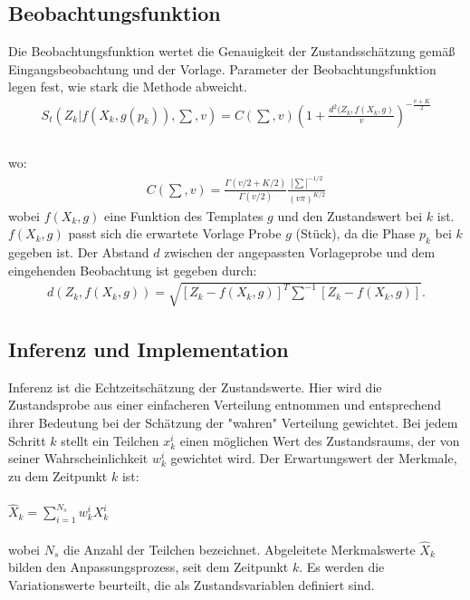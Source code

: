 \documentclass{llncs}
\begin{document}
\subsection{Beobachtungsfunktion} 
Die Beobachtungsfunktion wertet die Genauigkeit der Zustandsschätzung gemäß Eingangsbeobachtung und der Vorlage. Parameter der Beobachtungsfunktion legen fest, wie stark die Methode abweicht.
\begin{equation}
\left.\begin{array}{l}
S_t(Z_k|f(X_k, g(p_k)),\sum,v) = C(\sum, v)(1+ \frac{d^2(Z_k, f(X_k,g)}{v}  )^{-\frac{v+K}{2}}		
\\
\end{array}\right.		
\end{equation}	
\\
wo:
\begin{equation}
\left.\begin{array}{l}
C(\sum, v) =  \frac{\Gamma(v/2+K/2)  }{\Gamma(v/2) }\frac{|\sum|^{-1/2}}{(v \pi)^{K/2}}
\end{array}\right.
\end{equation}
wobei $f (X_k, g)$ eine Funktion des Templates $g$ und den Zustandswert bei $k$ ist. $ f (X_k, g)$ passt sich die erwartete Vorlage Probe $g$ (Stück), da die Phase $p_k$ bei $k$ gegeben ist. Der Abstand $d$ zwischen der angepassten Vorlageprobe und dem eingehenden Beobachtung ist gegeben durch:
\begin{equation}
\left.\begin{array}{l}
d(Z_k, f(X_k, g)) = \sqrt{[Z_k - f(X_k, g)]^T \sum^{-1} [Z_k - f(X_k,g)]}.			
\end{array}\right.		
\end{equation}	

\subsection{ Inferenz und Implementation}
Inferenz ist die Echtzeitschätzung der Zustandswerte. Hier wird die  Zustandsprobe aus einer einfacheren Verteilung entnommen und entsprechend ihrer Bedeutung bei der Schätzung der "wahren" Verteilung gewichtet. Bei jedem Schritt $k$ stellt ein Teilchen $x^i_k$ einen möglichen Wert des Zustandsraums, der von seiner Wahrscheinlichkeit $w^i _k$ gewichtet wird. Der Erwartungswert der Merkmale, zu dem Zeitpunkt $k$ ist:
\\
\\
$
\hat{X}_k = \sum_{i=1}^{N_s}{w^i_k} X^i_k
$
\\
\\
wobei $ N_s$ die Anzahl der Teilchen bezeichnet. Abgeleitete Merkmalswerte $\hat{X}_k$ bilden den Anpassungsprozess, seit dem Zeitpunkt $k$. Es werden die Variationswerte beurteilt, die als Zustandsvariablen definiert sind. 
\end{document}
